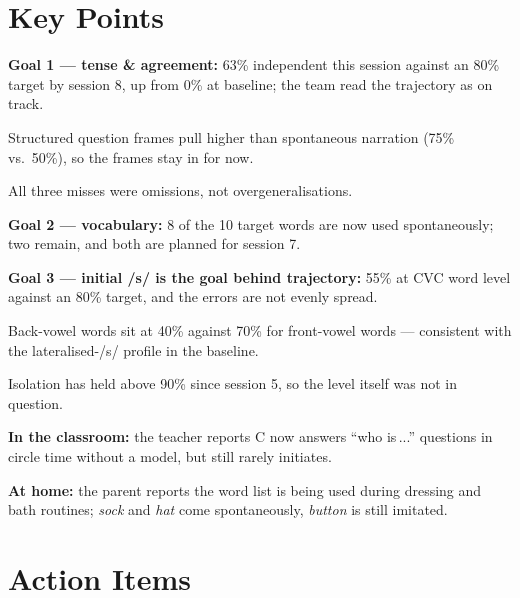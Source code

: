 \documentclass[10pt,a4paper]{article}
\begin{document}
\section{Key Points}
{\footnotesize
\begin{pts}
\item \textbf{Goal 1 --- tense \& agreement:} 63\% independent this session against an 80\% target by
      session 8, up from 0\% at baseline; the team read the trajectory as on track.
  \begin{pts}
  \item Structured question frames pull higher than spontaneous narration (75\% vs.\ 50\%), so the
        frames stay in for now.
  \item All three misses were omissions, not overgeneralisations.
  \end{pts}
\item \textbf{Goal 2 --- vocabulary:} 8 of the 10 target words are now used spontaneously; two remain,
      and both are planned for session 7.
\item \textbf{Goal 3 --- initial /s/ is the goal behind trajectory:} 55\% at CVC word level against an
      80\% target, and the errors are not evenly spread.
  \begin{pts}
  \item Back-vowel words sit at 40\% against 70\% for front-vowel words --- consistent with the
        lateralised-/s/ profile in the baseline.
  \item Isolation has held above 90\% since session 5, so the level itself was not in question.
  \end{pts}
\item \textbf{In the classroom:} the teacher reports C now answers ``who is\,...'' questions in circle
      time without a model, but still rarely initiates.
\item \textbf{At home:} the parent reports the word list is being used during dressing and bath
      routines; \emph{sock} and \emph{hat} come spontaneously, \emph{button} is still imitated.
\end{pts}}

\section{Action Items }
\end{document}

